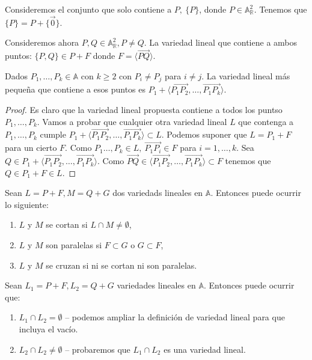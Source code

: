 \documentclass[14pt]{book}
\begin{document}
\begin{ej}
	Consideremos el conjunto que solo contiene a $P,\ \{P\}$, donde $P \in \mathbb{A}_\mathbb{R}^2$. Tenemos que $\{P\} = P + \{\vec{0}\}$.
	
	Consideremos ahora $P, Q \in \mathbb{A}_\mathbb{R}^2, P ≠ Q$. La variedad lineal que contiene a ambos puntos: $\{P, Q\} \in P + F$ donde $F = \langle \overrightarrow{PQ}\rangle$.
\end{ej}

\begin{pro}
	Dados $P_1, \dots, P_k \in \mathbb{A}$ con $k \geq 2$ con $P_i ≠ P_j$ para $i≠j$. La variedad lineal más pequeña que contiene a esos puntos es $P_1 + \langle \overrightarrow{P_1 P_2}, \dots, \overrightarrow{P_1 P_k}\rangle$.
\end{pro}

\begin{proof}
	Es claro que la variedad lineal propuesta contiene a todos los puntso $P_1, \dots, P_k$. Vamos a probar que cualquier otra variedad lineal $L$ que contenga a $P_1, \dots, P_k$ cumple $P_1 + \langle \overrightarrow{P_1 P_2}, \dots, \overrightarrow{P_1 P_k}\rangle \subset L$. Podemos suponer que $L = P_1 + F$ para un cierto $F$. Como $P_1 \dots, P_k \in L,\ \overrightarrow{P_1 P_i} \in F$ para $i = 1, \dots, k$. Sea $Q \in P_1 + \langle \overrightarrow{P_1 P_2}, \dots, \overrightarrow{P_1 P_k}\rangle$. Como $\overrightarrow{PQ} \in \langle \overrightarrow{P_1 P_2}, \dots, \overrightarrow{P_1 P_k}\rangle \subset F$ tenemos que $Q \in P_1 + F \in L$.
\end{proof}

\begin{dfn}
	Sean $L = P + F, M = Q + G$ dos variedads lineales en $\mathbb{A}$. Entonces puede ocurrir lo siguiente:
	\begin{enumerate}
		\item $L$ y $M$ se cortan si $L \cap M ≠ \emptyset$,
		\item $L$ y $M$ son paralelas si $F \subset G$ o $G \subset F$,
		\item $L$ y $M$ se cruzan si ni se cortan ni son paralelas.	
	\end{enumerate}
\end{dfn}

Sean $L_1 = P + F, L_2 = Q + G$ variedades lineales en $\mathbb{A}$. Entonces puede ocurrir que:
\begin{enumerate}
	\item $L_1 \cap L_2 = \emptyset$ – podemos ampliar la definición de variedad lineal para que incluya el vacío.
	\item $L_2 \cap L_2 ≠ \emptyset$ –  probaremos que $L_1 \cap L_2$ es una variedad lineal.
\end{enumerate}
\end{document}

